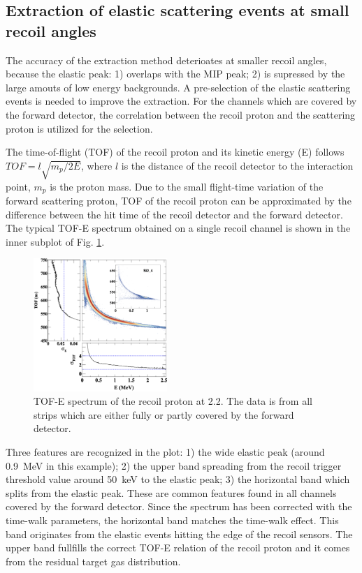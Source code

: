 \documentclass[number,5p]{elsarticle}
\begin{document}
\subsection{Extraction of elastic scattering events at small recoil angles}
The accuracy of the extraction method deterioates at smaller recoil angles, because the elastic peak:
1) overlaps with the MIP peak; 2) is supressed by the large amouts of low energy backgrounds.
A pre-selection of the elastic scattering events is needed to improve the extraction.
For the channels which are covered by the forward detector, the correlation
between the recoil proton and the scattering proton is utilized for the selection.

The time-of-flight (TOF) of the recoil proton and its kinetic energy (E)
follows $TOF = l\sqrt{m_p/2E}$, where $l$ is the distance of
the recoil detector to the interaction point, $m_p$ is the proton mass.
Due to the small flight-time variation of the forward scattering proton, TOF of
the recoil proton can be approximated by the difference between the hit time of the recoil detector and the forward detector.
The typical TOF-E spectrum obtained on a single recoil channel is shown in the inner subplot of Fig. \ref{fig:tof-e}. 
\begin{figure}[h!]
  \centering
  \includegraphics[width=0.45\textwidth]{./tofe_sigma.png}
  \caption{
    TOF-E spectrum of the recoil proton at \SI{2.2}{\momentum}. The data is from all
    strips which are either fully or partly covered by the forward detector.}
  \label{fig:tof-e}
\end{figure}
Three features are recognized in the plot: 1) the wide elastic peak (around
\SI{0.9}{\MeV} in this example);
2) the upper band spreading from the recoil trigger threshold value around
\SI{50}{\keV} to the elastic peak; 3) the horizontal band which splits from the
elastic peak. 
These are common features found in all channels covered by the forward detector.
Since the spectrum has been corrected with the time-walk parameters, the horizontal band matches the time-walk effect.
This band originates from the elastic events hitting the edge of the recoil sensors.
The upper band fullfills the correct TOF-E relation of the recoil proton and it comes
from the residual target gas distribution.
\end{document}
